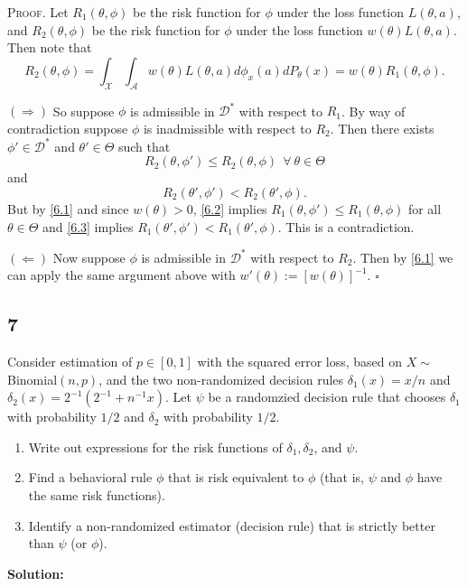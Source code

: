\documentclass[12pt]{article}
\newcounter{ProofCounter}
\newenvironment{Proof}{\stepcounter{ProofCounter}\textsc{Proof.}}{\hfill$\square$}
\begin{document}
\begin{Proof}
  Let $R_1(\theta, \phi)$ be the risk function for $\phi$ under the loss function $L(\theta, a)$, and $R_2(\theta, \phi)$ be the risk function for
  $\phi$ under the loss function $w(\theta)L(\theta, a)$. Then note that 
  \begin{equation}
    R_2(\theta, \phi) = \int_{\mathcal{X}}\int_{\mathcal{A}}w(\theta)L(\theta, a)d\phi_x(a)dP_{\theta}(x) = w(\theta)R_1(\theta, \phi).
    \label{6.1}
  \end{equation}

  $(\Rightarrow)$ So suppose $\phi$ is admissible in $\mathcal{D}^{*}$ with respect to $R_1$. By way of contradiction suppose $\phi$ is inadmissible 
  with respect to $R_2$. Then there exists $\phi' \in \mathcal{D}^{*}$ and $\theta' \in \Theta$ such that 
  \begin{equation}
    R_2(\theta, \phi') \leq R_2(\theta, \phi) \ \ \forall \ \theta \in \Theta
    \label{6.2}
  \end{equation}
  and 
  \begin{equation}
    R_2(\theta', \phi') < R_2(\theta', \phi).
    \label{6.3}
  \end{equation}
  But by \eqref{6.1} and since $w(\theta) > 0$, \eqref{6.2} implies $R_1(\theta, \phi') \leq R_1(\theta, \phi)$ for all $\theta \in \Theta$ and \eqref{6.3} implies $R_1(\theta',
  \phi') < R_1(\theta', \phi)$. This is a contradiction.

  $(\Leftarrow)$ Now suppose $\phi$ is admissible in $\mathcal{D}^{*}$ with respect to $R_2$. Then by \eqref{6.1} we can apply the same argument above with 
  $w'(\theta) := [w(\theta)]^{-1}$.
\end{Proof}


\newpage
\subsection*{7}
\begin{tcolorbox}
  Consider estimation of $p \in [0,1]$ with the squared error loss, based on $X\sim$Binomial$(n,p)$, and the two non-randomized decision rules
  $\delta_1(x)= x/n$ and $\delta_2(x)= 2^{-1}(  2^{-1} + n^{-1}x)$. Let $\psi$ be a randomzied decision rule that chooses $\delta_1$ with probability $1/2$ and $\delta_2$ with probability $1/2$.

  \begin{enumerate}
    \item Write out expressions for the risk functions of $\delta_1,\delta_2$, and $\psi$.
    \item Find a behavioral rule $\phi$ that is risk equivalent to $\phi$ (that is, $\psi$ and $\phi$ have the same risk functions).
    \item Identify a non-randomized estimator (decision rule) that is strictly better than $\psi$ (or $\phi$).
  \end{enumerate}
\end{tcolorbox}

\textbf{Solution:}
\end{document}
